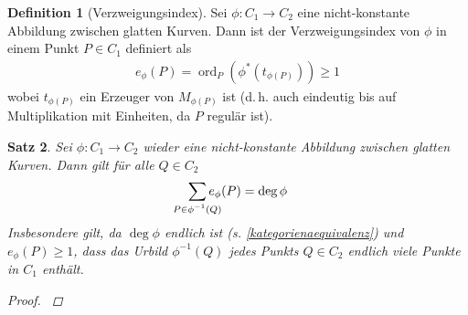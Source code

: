 \documentclass[english, german, parskip=half]{scrartcl}
\newtheorem{Satz}{Satz}[section]
\theoremstyle{definition}
\newtheorem{Definition}[Satz]{Definition}
\theoremstyle{remark}
\DeclareMathOperator{\ord}{ord} %
\begin{document}
\begin{Definition}[Verzweigungsindex]
  Sei $\phi\colon C_1\to C_2$ eine nicht-konstante Abbildung zwischen
  glatten Kurven.
  Dann ist der Verzweigungsindex von $\phi$ in einem Punkt
  $P\in C_1$ definiert als
  \begin{gather*}
    e_\phi(P) = \ord_P \left( \phi^*(t_{\phi(P)}) \right) \geq 1
  \end{gather*}
  wobei $t_{\phi(P)}$ ein Erzeuger von $M_{\phi(P)}$ ist (d.\,h. auch
  eindeutig bis auf Multiplikation mit Einheiten, da $P$ regulär ist).
\end{Definition}

\begin{Satz}
  Sei $\phi\colon C_1\to C_2$ wieder eine nicht-konstante Abbildung
  zwischen glatten Kurven. Dann gilt für alle $Q\in C_2$
  \begin{gather*}
    \sum_{\mathclap{P\in\phi^{-1}(Q)}} e_\phi(P) = \deg\phi
  \end{gather*}
  Insbesondere gilt, da $\deg\phi$ endlich ist
  (s. \ref{kategorienaequivalenz}) und $e_\phi(P)\geq 1$,
  dass das Urbild $\phi^{-1}(Q)$ jedes Punkts $Q\in C_2$
  endlich viele Punkte in $C_1$ enthält.
  \begin{proof}
    \cite[siehe][Proposition 2.6 (a)]{silverman}
  \end{proof}
\end{Satz}

\end{document}
